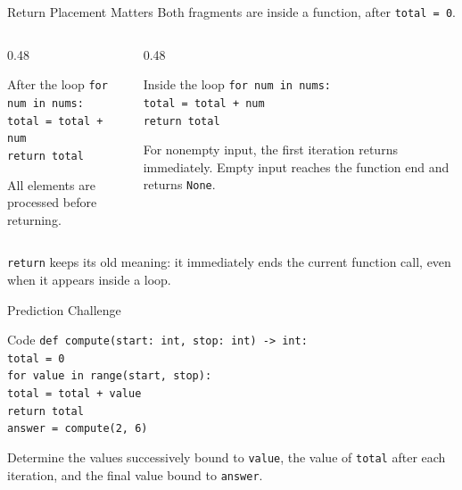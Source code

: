 \documentclass[aspectratio=169,10pt]{beamer}
\begin{document}
\begin{frame}{Return Placement Matters}
  Both fragments are inside a function, after \texttt{total = 0}.
  \begin{columns}[T,onlytextwidth]
    \begin{column}{0.48\textwidth}
      \begin{block}{After the loop}
        \texttt{for num in nums:}\\
        \hspace{0.18in}\texttt{total = total + num}\\
        \texttt{return total}
      \end{block}

      All elements are processed before returning.
    \end{column}
    \begin{column}{0.48\textwidth}
      \begin{block}{Inside the loop}
        \texttt{for num in nums:}\\
        \hspace{0.18in}\texttt{total = total + num}\\
        \hspace{0.18in}\texttt{return total}
      \end{block}

      For nonempty input, the first iteration returns immediately. Empty input reaches the function end and returns \texttt{None}.
    \end{column}
  \end{columns}

  \begin{keyidea}
    \texttt{return} keeps its old meaning: it immediately ends the current function call, even when it appears inside a loop.
  \end{keyidea}
\end{frame}


\begin{frame}{Prediction Challenge}
  \begin{block}{Code}
    \texttt{def compute(start: int, stop: int) -> int:}\\
    \hspace{0.20in}\texttt{total = 0}\\
    \hspace{0.20in}\texttt{for value in range(start, stop):}\\
    \hspace{0.40in}\texttt{total = total + value}\\
    \hspace{0.20in}\texttt{return total}\\[0.08in]
    \texttt{answer = compute(2, 6)}
  \end{block}

  \begin{activity}
    Determine the values successively bound to \texttt{value}, the value of \texttt{total} after each iteration, and the final value bound to \texttt{answer}.
  \end{activity}
\end{frame}
\end{document}
